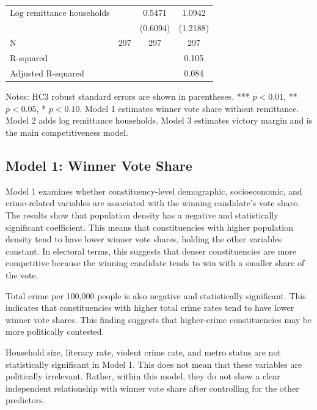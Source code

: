 \documentclass[12pt,a4paper]{article}
\begin{document}
\begin{table}[H]
\begin{tabular}{lccc}
Log remittance households 
& 
& 0.5471 
& 1.0942 \\

& 
& (0.6094) 
& (1.2188) \\

\midrule
N 
& 297 
& 297 
& 297 \\

R-squared 
& 
& 
& 0.105 \\

Adjusted R-squared 
& 
& 
& 0.084 \\

\bottomrule
\end{tabular}

\begin{flushleft}
\footnotesize
Notes: HC3 robust standard errors are shown in parentheses. 
*** \(p<0.01\), ** \(p<0.05\), * \(p<0.10\).
Model 1 estimates winner vote share without remittance. 
Model 2 adds log remittance households. 
Model 3 estimates victory margin and is the main competitiveness model.
\end{flushleft}
\end{table}

\subsection{Model 1: Winner Vote Share}

Model 1 examines whether constituency-level demographic, socioeconomic, and crime-related variables are associated with the winning candidate's vote share. The results show that population density has a negative and statistically significant coefficient. This means that constituencies with higher population density tend to have lower winner vote shares, holding the other variables constant. In electoral terms, this suggests that denser constituencies are more competitive because the winning candidate tends to win with a smaller share of the vote.

Total crime per 100,000 people is also negative and statistically significant. This indicates that constituencies with higher total crime rates tend to have lower winner vote shares. This finding suggests that higher-crime constituencies may be more politically contested.

Household size, literacy rate, violent crime rate, and metro status are not statistically significant in Model 1. This does not mean that these variables are politically irrelevant. Rather, within this model, they do not show a clear independent relationship with winner vote share after controlling for the other predictors.
\end{document}

